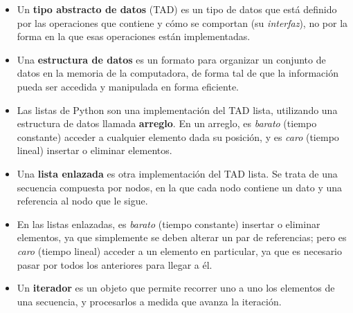 \begin{itemize}

\item Un {\bf tipo abstracto de datos} (TAD) es un tipo de datos que está
definido por las operaciones que contiene y cómo se comportan (su
\emph{interfaz}), no por la forma en la que esas operaciones están implementadas.

\item Una {\bf estructura de datos} es un formato para organizar un conjunto de
datos en la memoria de la computadora, de forma tal de que la información pueda
ser accedida y manipulada en forma eficiente.

\item Las listas de Python son una implementación del TAD lista, utilizando una
estructura de datos llamada {\bf arreglo}.  En un arreglo, es \emph{barato}
(tiempo constante) acceder a cualquier elemento dada su posición, y es
\emph{caro} (tiempo lineal) insertar o eliminar elementos.

\item Una {\bf lista enlazada} es otra implementación del TAD lista.
Se trata de una secuencia compuesta por nodos, en la que
cada nodo contiene un dato y una referencia al nodo que le sigue.

\item En las listas enlazadas, es \emph{barato} (tiempo constante) insertar o eliminar
elementos, ya que simplemente se deben alterar un par de referencias; pero
es \emph{caro} (tiempo lineal) acceder a un elemento en particular, ya que es necesario
pasar por todos los anteriores para llegar a él.

\item Un {\bf iterador} es un objeto que permite recorrer uno a uno los
elementos de una secuencia, y procesarlos a medida que avanza la iteración.

\end{itemize}

